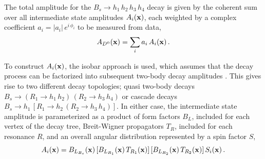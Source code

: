 The total amplitude for the 
$B_s \to h_{1}\,h_{2}\,h_{3} \, h_{4}$
decay is given by the coherent sum over all 
intermediate state amplitudes $A_{i}(\mathbf{x} )$, each weighted by a complex coefficient $a_{i} = \vert a_{i} \vert \, e^{i \, \phi_i}$
to be measured from data,
\begin{equation}
	A_{{{D}^0}}(\mathbf{x} ) = \sum_{i}  a_{i} \, A_{i}(\mathbf{x} )   \, .
\end{equation}

To construct $A_{i}(\mathbf{x} )$,
the isobar approach is used, which 
assumes that
the decay process can be factorized into subsequent two-body decay amplitudes \cite{isobar1,isobar,isobar2}.
This gives rise to two different decay topologies;
quasi two-body decays
$B_s \to (R_{1} \to h_{1}\,h_{2}) \, (R_{2} \to h_{3}\,h_{4})$ 
or cascade decays
$B_s \to h_{1} \, \left[R_{1} \to h_{2} \,  (R_{2} \to h_{3} \, h_{4}) \right]$.
%
%
In either case, the intermediate state amplitude is parameterized as a product of
form factors $B_{L}$, included for each vertex of the decay tree, 
Breit-Wigner propagators $T_{R}$,  included for each resonance $R$,
and an overall angular distribution represented by a spin factor $S$,
\begin{equation}
	A_{i}(\mathbf{x} ) =  B_{L_{B_s}}(\bold x) \, [B_{L_{R_{1}}}(\mathbf{x} )  \, T_{R_{1}}(\mathbf{x} )] \, [B_{L_{R_{2}}}(\mathbf{x} ) \, T_{R_{2}}(\mathbf{x} )]  \,  S_{i}(\mathbf{x} )  \, .
	\label{eq:amp4}
\end{equation}

